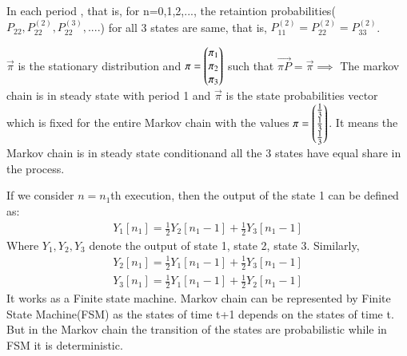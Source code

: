 \documentclass[journal,12pt,twocolumn]{IEEEtran}
\renewcommand\thesection{\arabic{section}}
\begin{document}
In each period , that is, for n=0,1,2,..., the retaintion probabilities($P_{22}, P_{22}^{(2)}, P_{22}^{(3)},....$) for all 3 states are same, that is, $P_{11}^{(2)}=P_{22}^{(2)}=P_{33}^{(2)}$.

$\vec{\pi}$ is the stationary distribution and $\mathbf{\pi}=\begin{pmatrix}\pi_1\\\pi_2\\\pi_3\end{pmatrix}$ such that $\vec{\pi P}=\vec{\pi} \implies$ The markov chain is in steady state with period 1 and $\vec{\pi}$ is the state probabilities vector which is fixed for the entire Markov chain with the values $\mathbf{\pi}=\begin{pmatrix}\frac{1}{3}\\\frac{1}{3}\\\frac{1}{3}\end{pmatrix}$. It means the Markov chain is in steady state conditionand all the 3 states have equal share in the process.

If we consider $n=n_1$th execution, then the output of the state 1 can be defined as:
\begin{align}
Y_1[n_1]= \frac{1}{2}Y_2[n_1-1]+ \frac{1}{2}Y_3[n_1-1]
\end{align}
Where $Y_1, Y_2, Y_3$ denote the output of state 1, state 2, state 3. Similarly,
\begin{align}
Y_2[n_1]= \frac{1}{2}Y_1[n_1-1]+ \frac{1}{2}Y_3[n_1-1]\\
Y_3[n_1]= \frac{1}{2}Y_1[n_1-1]+ \frac{1}{2}Y_2[n_1-1]
\end{align}
It works as a Finite state machine. Markov chain can be represented by Finite State Machine(FSM) as the states of time t+1 depends on the states of time t. But in the Markov chain the transition of the states are probabilistic while in FSM it is deterministic.

%
\end{document}
